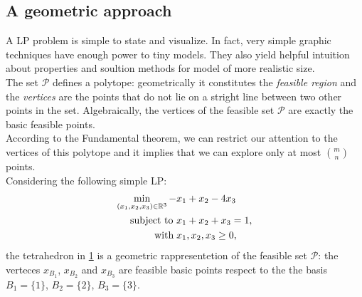 \documentclass[a4paper,10 pt,titlepage,twoside]{book}
\theoremstyle{plain}
\theoremstyle{definition}
\theoremstyle{remark}
\begin{document}
\subsection*{A geometric approach}
A LP problem is simple to state and visualize. In fact, very simple graphic techniques have enough power to tiny models. They also yield helpful intuition about properties and soultion methods for model of more realistic size.\\ The set $\mathcal{P}$ defines a polytope: geometrically it constitutes the \textit{feasible region} and the \textit{vertices} are the points that do not lie on a stright line between two other points in the set. Algebraically, the vertices of the feasible set $\mathcal{P}$ are exactly the basic feasible points.\\ According to the Fundamental theorem, we can restrict our attention to the vertices of this polytope and it implies that we can explore only at most  ${m}\choose{n}$ points.\\[0.5cm]
Considering the following simple LP:
\begin{align*}
\min\limits_{(x_{1},x_{2},x_{3})\in\mathbb{R}^{3}} -&x_{1}+ x_{2}-4x_{3}\\
\text{subject to }&x_{1}+x_{2}+x_{3}=1,\\
 \text{\; with\;} &x_{1}, x_{2}, x_{3} \geq 0,
\end{align*}
the tetrahedron in \ref{tetra} is a geometric rappresentetion of the feasible set $\mathcal{P}$: the verteces ${x}_{B_{1}}$, ${x}_{B_{2}}$ and ${x}_{B_{3}}$ are feasible basic points respect to the the basis $B_{1} =\{1\}$,  $B_{2} =\{2\}$,  $B_{3} =\{3\}$.
\begin{figure}[h]\caption{\label{tetra}}
\begin{center}
\end{center}
\end{figure}
\end{document}
